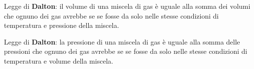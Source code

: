 Legge di \textbf{Dalton}: il volume di una miscela di gas è uguale alla somma dei volumi che ognuno dei gas avrebbe se se fosse da solo nelle stesse condizioni di temperatura e pressione della miscela.

Legge di \textbf{Dalton}: la pressione di una miscela di gas è uguale alla somma delle pressioni che ognuno dei gas avrebbe se se fosse da solo nelle stesse condizioni di temperatura e volume della miscela.
